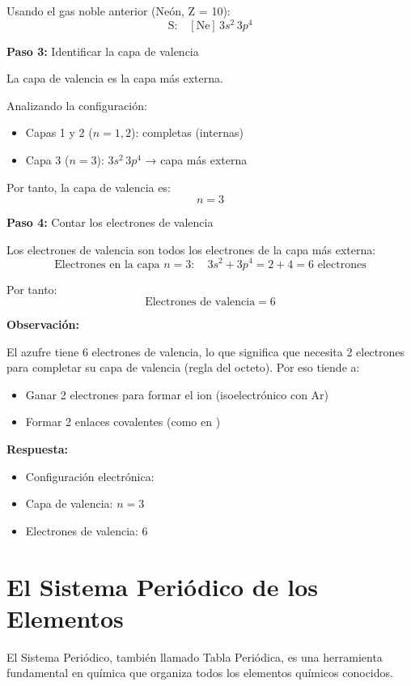\begin{exercise}
\begin{solu}
        Usando el gas noble anterior (Neón, Z = 10):
        \[
            \text{S:} \quad [\text{Ne}] \, 3s^2 \, 3p^4
        \]

        \textbf{Paso 3:} Identificar la capa de valencia

        La capa de valencia es la capa más externa.

        Analizando la configuración:
        \begin{itemize}
            \item Capas 1 y 2 (\(n = 1, 2\)): completas (internas)
            \item Capa 3 (\(n = 3\)): \(3s^2 \, 3p^4\) → capa más externa
        \end{itemize}

        Por tanto, la capa de valencia es:
        \[
            \boxed{n = 3}
        \]

        \textbf{Paso 4:} Contar los electrones de valencia

        Los electrones de valencia son todos los electrones de la capa más externa:
        \[
            \text{Electrones en la capa } n = 3: \quad 3s^2 + 3p^4 = 2 + 4 = 6 \text{ electrones}
        \]

        Por tanto:
        \[
            \boxed{\text{Electrones de valencia} = 6}
        \]

        \textbf{Observación:}

        El azufre tiene 6 electrones de valencia, lo que significa que necesita 2 electrones para completar su capa de valencia (regla del octeto). Por eso tiende a:
        \begin{itemize}
            \item Ganar 2 electrones para formar el ion  (isoelectrónico con Ar)
            \item Formar 2 enlaces covalentes (como en )
        \end{itemize}

        \textbf{Respuesta:}
        \begin{itemize}
            \item Configuración electrónica: 
            \item Capa de valencia: \(n = 3\)
            \item Electrones de valencia: 6
        \end{itemize}
    \end{solu}
\end{exercise}
\section{El Sistema Periódico de los Elementos}
El Sistema Periódico, también llamado Tabla Periódica, es una herramienta fundamental en química que organiza todos los elementos químicos conocidos.
